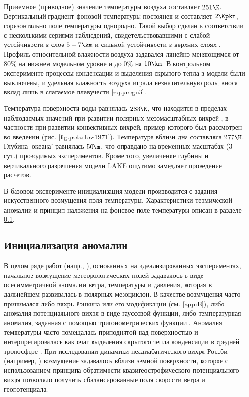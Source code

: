 Приземное (приводное) значение температуры воздуха составляет $251\K$. Вертикальный градиент фоновой температуры постоянен и составляет $2\Kpkm$, горизонтально поле температуры однородно. Такой выбор сделан в соответствии с несколькими сериями наблюдений, свидетельствовавшими о слабой устойчивости в слое $5-7\km$ и сильной устойчивости в верхних слоях \citep{EmanuelRotunno1989}. Профиль относительной влажности воздуха задавался линейно меняющимся от $80\%$ на нижнем модельном уровне и до $0\%$ на $10\km$. В контрольном эксперименте процессы конденсации и выделения скрытого тепла в модели были выключены, и удельная влажность воздуха играла незначительную роль, внося вклад лишь в слагаемое плавучести \eqref{eq:progn3}.

Температура поверхности воды равнялась $283\K$, что находится в пределах наблюдаемых значений при развитии полярных мезомасштабных вихрей \citep{ForbesLottes1985}, в частности при развитии конвективных вихрей, пример которого был рассмотрен во введении (рис. \ref{fig:polarlow1971}). Температура вблизи дна составляла $277\K$. Глубина 'океана' равнялась $50\m$, что оправдано на временных масштабах (3 сут.) проводимых экспериментов. Кроме того, увеличение глубины и вертикального разрешения модели LAKE ощутимо замедляет проведение расчетов.

В базовом эксперименте инициализация модели производится с задания искусственного возмущения поля температуры. Характеристики термической аномалии и принцип наложения на фоновое поле температуры описан в разделе \ref{sec:initanom}.

\subsection{Инициализация аномалии}
\label{sec:initanom}
В целом ряде работ (напр., \citep{Adakudlu2012}), основанных на идеализированных экспериментах, начальное возмущение метеорологических полей задавалось в виде осесимметричной аномалии ветра, температуры и давления, которая в дальнейшем развивалась в полярных мезоциклон. В качестве возмущения часто принимался либо вихрь Рэнкина \citep{EmanuelRotunno1989,RenfrewEtAl1997} или его модификации (см. \ref{app:B}), либо аномалия потенциального вихря в виде гауссовой функции, либо температурная аномалия, заданная с помощью тригонометрических функций \citep{EggerHoinka2010}. Аномалия температуры часто помещалась приподнятой над поверхностью и интерпретировалась как очаг выделения скрытого тепла конденсации в средней тропосфере \citep{RT2003}. При исследовании динамики неадиабатического вихря Россби (например, \citep{MooreMontgomery2005}) возмущение задавалось вблизи земной поверхности, которое с использованием принципа обратимости квазигеострофического потенциального вихря позволяло получить сбалансированные поля скорости ветра и геопотенциала.

